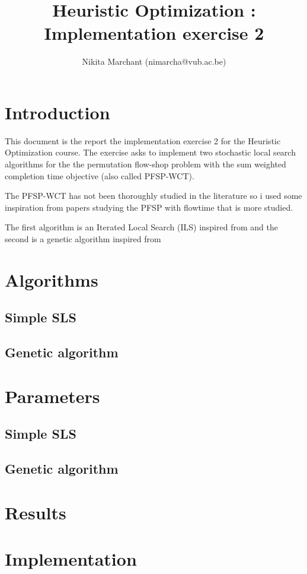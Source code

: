 \documentclass[a4paper]{article}
\title{Heuristic Optimization : Implementation exercise 2}
\author{Nikita Marchant (nimarcha@vub.ac.be)}
\begin{document}
\maketitle

\section{Introduction}

This document is the report the implementation exercise 2 for the Heuristic Optimization course.
The exercise asks to implement two stochastic local search algorithms for the the permutation flow-shop problem with the sum weighted completion time objective (also called PFSP-WCT).

The PFSP-WCT has not been thoroughly studied in the literature so i used some inspiration from papers studying the PFSP with flowtime that is more studied.

The first algorithm is an Iterated Local Search (ILS) inspired from \cite{panruiz2012} and the second is a genetic algorithm inspired from \cite{zhang2009}

\section{Algorithms}
      \subsection{Simple SLS}
      \subsection{Genetic algorithm}


\section{Parameters}
      \subsection{Simple SLS}
      \subsection{Genetic algorithm}

\section{Results}

\section{Implementation}
\end{document}
